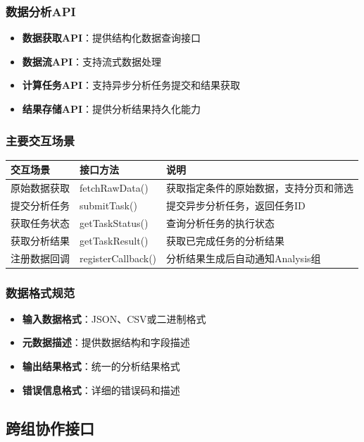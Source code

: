 \documentclass[a4paper,12pt]{article}
\begin{document}
\subsubsection{数据分析API}

\begin{itemize}
  \item \textbf{数据获取API}：提供结构化数据查询接口
  \item \textbf{数据流API}：支持流式数据处理
  \item \textbf{计算任务API}：支持异步分析任务提交和结果获取
  \item \textbf{结果存储API}：提供分析结果持久化能力
\end{itemize}

\subsubsection{主要交互场景}

\begin{longtable}{|p{3cm}|p{4cm}|p{8cm}|}
\hline
\textbf{交互场景} & \textbf{接口方法} & \textbf{说明} \\
\hline
\endhead
原始数据获取 & fetchRawData() & 获取指定条件的原始数据，支持分页和筛选 \\
\hline
提交分析任务 & submitTask() & 提交异步分析任务，返回任务ID \\
\hline
获取任务状态 & getTaskStatus() & 查询分析任务的执行状态 \\
\hline
获取分析结果 & getTaskResult() & 获取已完成任务的分析结果 \\
\hline
注册数据回调 & registerCallback() & 分析结果生成后自动通知Analysis组 \\
\hline
\end{longtable}

\subsubsection{数据格式规范}

\begin{itemize}
  \item \textbf{输入数据格式}：JSON、CSV或二进制格式
  \item \textbf{元数据描述}：提供数据结构和字段描述
  \item \textbf{输出结果格式}：统一的分析结果格式
  \item \textbf{错误信息格式}：详细的错误码和描述
\end{itemize}

\subsection{跨组协作接口}
\end{document}
